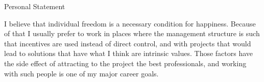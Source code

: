 \begin{rubric}{Personal Statement}{
    \entry*

    I believe that individual freedom is a necessary condition for
happiness. Because of that I usually prefer to work in places where
the management structure is such that incentives are used instead of
direct control, and with projects that would lead to solutions that
have what I think are intrinsic values. Those factors have the side
effect of attracting to the project the best professionals, and
working with such people is one of my major career goals.

  }
\end{rubric}
